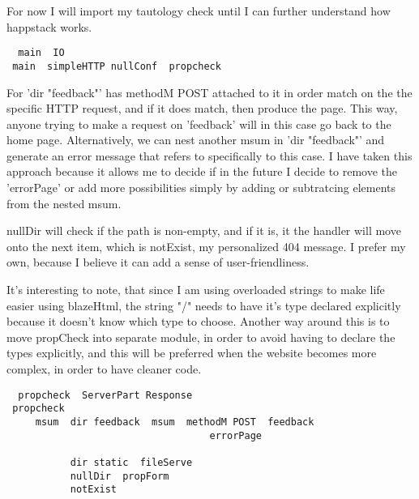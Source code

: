 \documentclass{article}
\begin{document}
For now I will import my tautology check until I can further understand how
happstack works.

\begin{tabbing}\tt
~main~~IO~\\
\tt ~main~~simpleHTTP~nullConf~~propcheck
\end{tabbing}

For 'dir "feedback"' has methodM POST attached to it in order match on the
the specific HTTP request, and if it does match, then produce the page.
This way, anyone trying to make a request on 'feedback' will in
this case go back to the home page.  Alternatively, we can nest another msum in
'dir "feedback"' and generate an error message that refers to specifically to
this case. I have taken this approach because it allows me to decide if in the
future I decide to remove the 'errorPage' or add more possibilities simply by
adding or subtratcing elements from the nested msum.

nullDir will check if the path is non-empty, and if it is, it the handler will
move onto the next item, which is notExist, my personalized 404 message. I
prefer my own, because I believe it can add a sense of user-friendliness.

It's interesting to note, that since I am using overloaded strings to make life
easier using blazeHtml, the string "/" needs to have it's type declared
explicitly because it doesn't know which type to choose. Another way around this
is to move propCheck into separate module, in order to avoid having to declare
the types explicitly, and this will be preferred when the website becomes more
complex, in order to have cleaner code.

\begin{tabbing}\tt
~propcheck~~ServerPart~Response\\
\tt ~propcheck~~\\
\tt ~~~~~msum~~dir~feedback~~msum~~methodM~POST~~feedback\\
\tt ~~~~~~~~~~~~~~~~~~~~~~~~~~~~~~~~~~~errorPage\\
\tt ~~~~~~~~~~~~~~~~~~~~~~~~~~~~~~~~~~\\
\tt ~~~~~~~~~~~dir~static~~fileServe~~~\\
\tt ~~~~~~~~~~~nullDir~~propForm\\
\tt ~~~~~~~~~~~notExist\\
\tt ~~~~~~~~~~
\end{tabbing}
\end{document}
